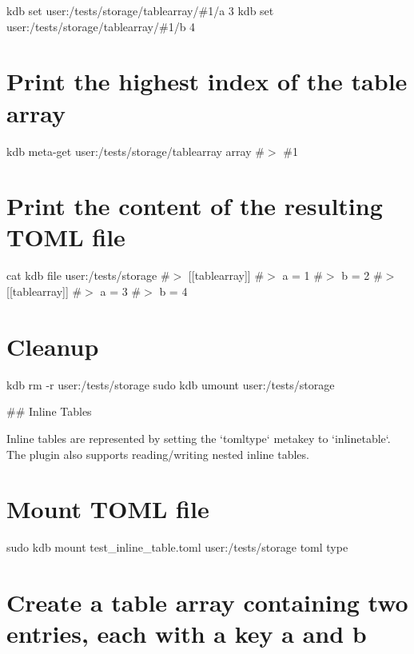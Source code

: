 kdb set \textquotesingle{}user\+:/tests/storage/tablearray/\#1/a\textquotesingle{} \textquotesingle{}3\textquotesingle{} kdb set \textquotesingle{}user\+:/tests/storage/tablearray/\#1/b\textquotesingle{} \textquotesingle{}4\textquotesingle{}\hypertarget{autotoc_md642_autotoc_md715}{}\section{Print the highest index of the table array}\label{autotoc_md642_autotoc_md715}
kdb meta-\/get \textquotesingle{}user\+:/tests/storage/tablearray\textquotesingle{} \textquotesingle{}array\textquotesingle{} \#$>$ \#1\hypertarget{autotoc_md642_autotoc_md716}{}\section{Print the content of the resulting T\+O\+M\+L file}\label{autotoc_md642_autotoc_md716}
cat {\ttfamily kdb file user\+:/tests/storage} \#$>$ \mbox{[}\mbox{[}tablearray\mbox{]}\mbox{]} \#$>$ a = 1 \#$>$ b = 2 \#$>$ \mbox{[}\mbox{[}tablearray\mbox{]}\mbox{]} \#$>$ a = 3 \#$>$ b = 4\hypertarget{autotoc_md642_autotoc_md717}{}\section{Cleanup}\label{autotoc_md642_autotoc_md717}
kdb rm -\/r user\+:/tests/storage sudo kdb umount user\+:/tests/storage 
\begin{DoxyCode}
## Inline Tables

Inline tables are represented by setting the `tomltype` metakey to `inlinetable`. The plugin also supports
       reading/writing nested inline tables.
\end{DoxyCode}
 \hypertarget{autotoc_md642_autotoc_md718}{}\section{Mount T\+O\+M\+L file}\label{autotoc_md642_autotoc_md718}
sudo kdb mount test\+\_\+inline\+\_\+table.\+toml user\+:/tests/storage toml type\hypertarget{autotoc_md642_autotoc_md719}{}\section{Create a table array containing two entries, each with a key \textquotesingle{}a\textquotesingle{} and \textquotesingle{}b\textquotesingle{}}\label{autotoc_md642_autotoc_md719}
